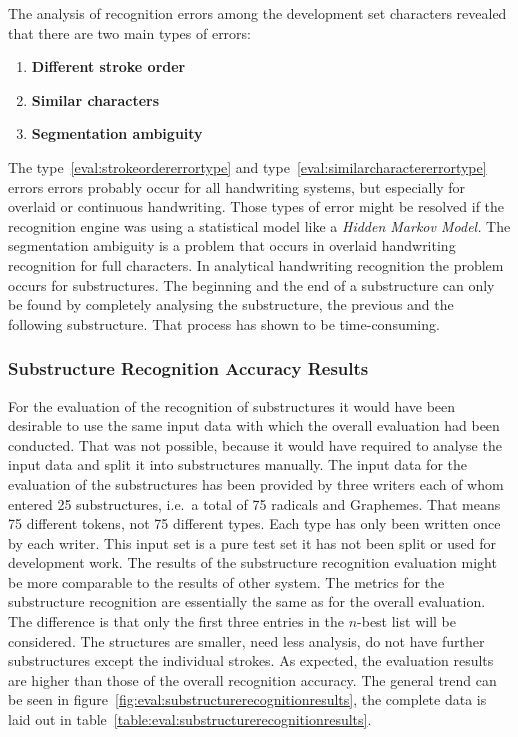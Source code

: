 The analysis of recognition errors among the development set characters 
revealed that there are two main types of errors: 
\begin{enumerate}
\item \textbf{Different stroke order}\label{eval:strokeordererrortype}
\item \textbf{Similar characters}    \label{eval:similarcharactererrortype}
\item \textbf{Segmentation ambiguity}\label{eval:segmentationambiguityerrortype}
\end{enumerate}
The type~\ref{eval:strokeordererrortype} and 
type~\ref{eval:similarcharactererrortype} errors errors probably occur for
all handwriting systems, but especially for overlaid or continuous handwriting.
Those types of error might be resolved if the recognition engine
was using a statistical model like a \emph{Hidden Markov Model.}
The segmentation ambiguity is a problem that occurs in overlaid handwriting
recognition for full characters. In analytical handwriting recognition
the problem occurs for substructures. The beginning and the end
of a substructure can only be found by completely analysing the substructure,
the previous and the following substructure. That process has
shown to be time-consuming.

\subsubsection{Substructure Recognition Accuracy Results}
\label{sec:eval:resultssubstructurerecognition}
For the evaluation of the recognition of substructures it would have been
desirable to use the same input data with which the overall evaluation
had been conducted. That was not possible, because it would have required
to analyse the input data and split it into substructures manually.
The input data for the evaluation of the substructures has been provided by
three writers each of whom entered 25 substructures, i.e.\ a total of 75
radicals and Graphemes. That means 75 different tokens, not 75 different types.
Each type has only been written once by each writer.
This input set is a pure test set it has not been split or used for
development work. The results of the substructure recognition evaluation
might be more comparable to the results of other system.
The metrics for the substructure recognition are essentially the same as for
the overall evaluation.
The difference is that only the first three entries in the \(n\)-best list
will be considered. The structures are smaller, need less analysis, do not
have further substructures except the individual strokes. 
As expected, the evaluation results are higher than those of the overall 
recognition accuracy. The general trend can be seen in 
figure~\ref{fig:eval:substructurerecognitionresults}, the complete data is
laid out in table~\ref{table:eval:substructurerecognitionresults}.

